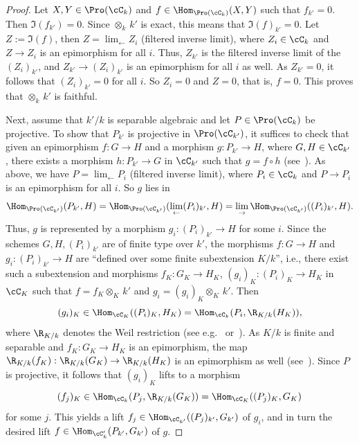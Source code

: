 \begin{proof}
Let $X, Y \in \Pro(\cC_k)$ and $f \in \Hom_{\Pro(\cC_k)}(X,Y)$ such that $f_{k'} = 0$. Then $\Im(f_{k'}) = 0$. Since $\otimes_k \, k'$ is exact, this means that $\Im(f)_{k'} = 0$. Let $Z := \Im(f)$, then $Z = \lim_{\leftarrow} Z_i$ (filtered inverse limit), where $Z_i \in \cC_k$ and $Z \to Z_i$ is an epimorphism for all $i$. Thus, $Z_{k'}$ is the filtered inverse limit of the $(Z_i)_{k'}$, and $Z_{k'} \to (Z_i)_{k'}$ is an epimorphism for all $i$ as well. As $Z_{k'} = 0$, it follows that $(Z_i)_{k'} = 0$ for all $i$. So $Z_i = 0$ and $Z = 0$, that is, $f = 0$. This proves that $\otimes_k \, k'$ is faithful.

Next, assume that $k'/k$ is separable algebraic and let $P \in \Pro(\cC_k)$ be projective. To show that $P_{k'}$ is projective in $\Pro(\cC_{k'})$, it suffices to check that given an epimorphism $f: G \to H$ and a morphism $g : P_{k'} \to H$, where $G,H \in \cC_{k'}$, there exists a morphism $h : P_{k'} \to G$ in $\cC_{k'}$ such that $g = f \circ h$ (see~\cite[V.2.3.5]{DG}). As above, we have $P = \lim_{\leftarrow} P_i$ (filtered inverse limit), where $P_i \in \cC_k$ and $P \to P_i$ is an epimorphism for all $i$. So $g$ lies in
\[
\Hom_{\Pro(\cC_{k'})}(P_{k'}, H) = \Hom_{\Pro(\cC_{k'})}(\lim_{\leftarrow}(P_i)_{k'}, H) = \lim_{\to} \Hom_{\Pro(\cC_{k'})}((P_i)_{k'}, H).
\]
Thus, $g$ is represented by a morphism $g_i : (P_i)_{k'} \to H$ for some $i$. Since the schemes $G,H,(P_i)_{k'}$ are of finite type over $k'$, the morphisms $f: G \to H$ and $g_i : (P_i)_{k'} \to H$ are ``defined over some finite subextension $K/k$'', i.e., there exist such a subextension and morphisms $f_K : G_K \to H_K$, $(g_i)_K : (P_i)_K \to H_K$ in $\cC_K$ such that $f = f_K \otimes_K \, k'$ and $g_i = (g_i)_K \otimes_K \, k'$. Then
\[
(g_i)_K \in \Hom_{\cC_K}((P_i)_K, H_K) = \Hom_{\cC_k}(P_i, \R_{K/k}(H_K)),
\]
where $\R_{K/k}$ denotes the Weil restriction (see e.g.~\cite[I.1.6.6]{DG} or~\cite[App.~B]{CGP}). As $K/k$ is finite and separable and $f_K : G_K \to H_K$ is an epimorphism, the map $\R_{K/k}(f_K) : \R_{K/k}(G_K) \to \R_{K/k}(H_K)$ is an epimorphism as well (see~\cite[III.5.7.9]{DG}). Since $P$ is projective, it follows that $(g_i)_K$ lifts to a morphism
\[
(f_j)_K \in \Hom_{\cC_k}(P_j, \R_{K/k}(G_K)) = \Hom_{\cC_K}((P_j)_K, G_K)
\]
for some $j$. This yields a lift $f_j \in \Hom_{\cC_{k'}}((P_j)_{k'}, G_{k'})$ of $g_i$, and in turn the desired lift $f \in \Hom_{\cC_k'}(P_{k'}, G_{k'})$ of $g$.
\end{proof}

